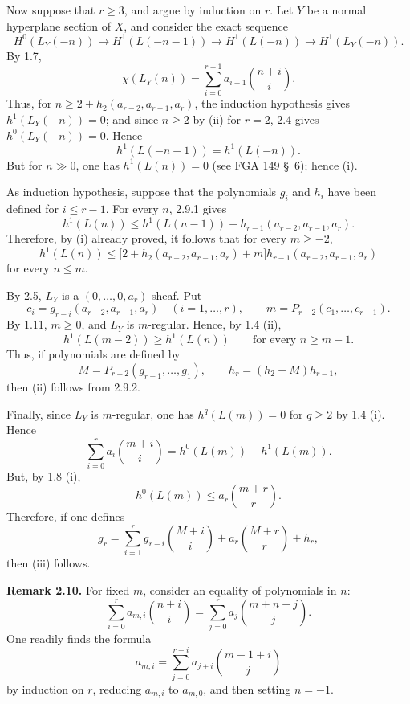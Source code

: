 Now suppose that \(r\ge3\), and argue by induction on \(r\). Let \(Y\)
be a normal hyperplane section of \(X\), and consider the exact sequence
\begin{equation}
H^0(L_Y(-n))\longrightarrow H^1(L(-n-1))
\longrightarrow H^1(L(-n))\longrightarrow H^1(L_Y(-n)).
\tag{2.9.1}
\end{equation}
By 1.7,
\[
\chi(L_Y(n))=
\sum_{i=0}^{r-1}a_{i+1}\binom{n+i}{i}.
\]
Thus, for \(n\ge2+h_2(a_{r-2},a_{r-1},a_r)\), the induction
hypothesis gives \(h^1(L_Y(-n))=0\); and since \(n\ge2\) by (ii) for
\(r=2\), 2.4 gives \(h^0(L_Y(-n))=0\). Hence
\[
h^1(L(-n-1))=h^1(L(-n)).
\]
But for \(n\gg0\), one has \(h^1(L(n))=0\) (see FGA 149 \S~6); hence
(i).

As induction hypothesis, suppose that the polynomials \(g_i\) and \(h_i\)
have been defined for \(i\le r-1\). For every \(n\), 2.9.1 gives
\[
h^1(L(n))\le h^1(L(n-1))
+h_{r-1}(a_{r-2},a_{r-1},a_r).
\]
Therefore, by (i)
already proved, it follows that for every \(m\ge-2\),
\begin{equation}
h^1(L(n))\le
\bigl[2+h_2(a_{r-2},a_{r-1},a_r)+m\bigr]
h_{r-1}(a_{r-2},a_{r-1},a_r)
\tag{2.9.2}
\end{equation}
for every \(n\le m\).

By 2.5, \(L_Y\) is a \((0,\ldots,0,a_r)\)-sheaf. Put
\[
c_i=g_{r-i}(a_{r-2},a_{r-1},a_r)
\quad(i=1,\ldots,r),
\qquad
m=P_{r-2}(c_1,\ldots,c_{r-1}).
\]
By 1.11, \(m\ge0\), and \(L_Y\) is \(m\)-regular. Hence, by 1.4 (ii),
\[
h^1(L(m-2))\ge h^1(L(n))
\qquad\text{for every }n\ge m-1.
\]
Thus, if polynomials are defined by
\[
M=P_{r-2}(g_{r-1},\ldots,g_1),
\qquad
h_r=(h_2+M)h_{r-1},
\]
then (ii) follows from 2.9.2.

Finally, since \(L_Y\) is \(m\)-regular, one has \(h^q(L(m))=0\) for
\(q\ge2\) by 1.4 (i). Hence
\[
\sum_{i=0}^{r}a_i\binom{m+i}{i}
=h^0(L(m))-h^1(L(m)).
\]
But, by 1.8 (i),
\[
h^0(L(m))\le a_r\binom{m+r}{r}.
\]
Therefore, if one defines
\[
g_r=
\sum_{i=1}^{r}g_{r-i}\binom{M+i}{i}
+a_r\binom{M+r}{r}+h_r,
\]
then (iii) follows.

\textbf{Remark 2.10.} For fixed \(m\), consider an equality of
polynomials in \(n\):
\[
\sum_{i=0}^{r}a_{m,i}\binom{n+i}{i}
=\sum_{j=0}^{r}a_j\binom{m+n+j}{j}.
\]
One readily finds the formula
\[
a_{m,i}=
\sum_{j=0}^{r-i}a_{j+i}\binom{m-1+i}{j}
\]
by induction on \(r\), reducing \(a_{m,i}\) to \(a_{m,0}\), and then
setting \(n=-1\).

